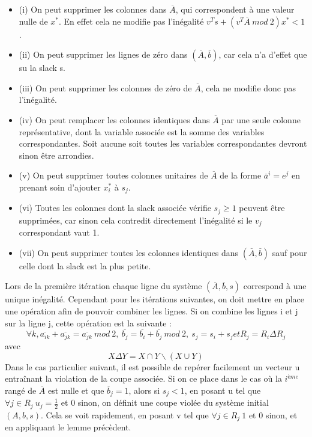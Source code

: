 \documentclass[12pt]{report}
\begin{document}
\begin{itemize}
    \item (i) On peut supprimer les colonnes dans $\overset{\_}{A}$, qui correspondent à une valeur nulle de $x^\ast$. En effet cela ne modifie pas l'inégalité $v^Ts+(v^T\overset{\_}{A}\ mod\ 2)x^\ast < 1 $.
    \item (ii) On peut supprimer les lignes de zéro dans $(\overset{\_}{A},\overset{\_}{b})$, car cela n'a d'effet que su la slack s.
    \item (iii) On peut supprimer les colonnes de zéro de $\overset{\_}{A}$, cela ne modifie donc pas l'inégalité.
    \item (iv) On peut remplacer les colonnes identiques dans $\overset{\_}{A}$ par une seule colonne représentative, dont la variable associée est la somme des variables correspondantes. Soit aucune soit toutes les variables correspondantes devront sinon être arrondies.
    \item (v) On peut supprimer toutes colonnes unitaires de $\overset{\_}{A}$ de la forme $\overset{\_}{a}^i=e^j $ en prenant soin d'ajouter $x_i^\ast$ à $s_j$. 
    \item (vi) Toutes les colonnes dont la slack associée vérifie $s_j\ge1$ peuvent être supprimées, car sinon cela contredit directement l'inégalité si le $v_j$ correspondant vaut 1.
    \item (vii) On peut supprimer toutes les colonnes identiques dans $(\overset{\_}{A},\overset{\_}{b})$ sauf pour celle dont la slack est la plus petite.
\end{itemize}
Lors de la première itération chaque ligne du système $(\overset{\_}{A},\overset{\_}{b},s)$ correspond à une unique inégalité. Cependant pour les itérations suivantes, on doit mettre en place une opération afin de pouvoir combiner les lignes.
Si on combine les lignes i et j sur la ligne j, cette opération est la suivante :
$$
\forall k, \overset{\_}{a_{ik}}+\overset{\_}{a_{jk}}=\overset{\_}{a_{jk}} \ mod \ 2, \ \overset{\_}{b_{j}}=\overset{\_}{b_{i}}+\overset{\_}{b_{j}} \ mod \ 2, \ s_j=s_i+s_j et R_j=R_i\Delta R_j
$$
avec
$$
X\Delta Y= X\cap Y \backslash (X \cup Y)
$$
Dans le cas particulier suivant, il est possible de repérer facilement un vecteur u entraînant la violation de la coupe associée. Si on ce place dans le cas où la $i^{ème}$ rangé de $\overset{\_}{A}$ est nulle et que $\overset{\_}{b}_j = 1$, alors si $s_j<1$, en posant u tel que $\forall j \in R_j \ u_j=\frac{1}{2} $ et 0 sinon, on définit une coupe violée du système initial $(A,b,s)$. Cela se voit rapidement, en posant v tel que $\forall j \in R_j \ 1  $ et 0 sinon, et en appliquant le lemme précèdent. 
\end{document}
